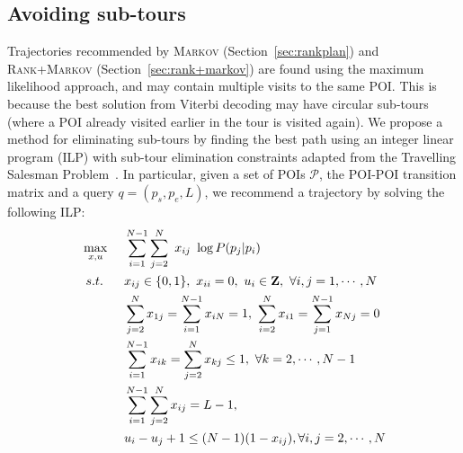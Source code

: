\subsection{Avoiding sub-tours} %
\label{sec:nosubtour}
\secmoveup

Trajectories recommended by \textsc{Markov} (Section~\ref{sec:rankplan}) and \textsc{Rank+Markov} (Section~\ref{sec:rank+markov})
are found using the maximum likelihood approach, and may contain multiple visits to the same POI.
This is because the best solution from Viterbi decoding %
may have
circular sub-tours (where a POI already visited earlier in the tour is visited again).
We propose a method for eliminating sub-tours by %
%
finding the best path using an integer linear program (ILP) with
sub-tour elimination constraints adapted from the Travelling Salesman Problem~\cite{opt98}.
In particular, given a set of POIs $\mathcal{P}$, the POI-POI transition matrix and a query $q = (p_s, p_e, L)$,
we recommend a trajectory by solving the following ILP:
\eqmoveup
\begin{alignat}{5}
\eqmoveup
& \max_{x,u}  ~&& \sum_{i=1}^{N-1} \sum_{j=2}^N ~x_{ij} ~\log P(p_j | p_i)                                                 \nonumber \\
& ~s.t. ~&& x_{ij} \in \{0, 1\}, ~x_{ii} = 0, ~u_i \in \mathbf{Z}, ~\forall i, j = 1, \cdots, N                    \label{eq:cons1} \\
&        && \sum_{j=2}^N x_{1j} = \sum_{i=1}^{N-1} x_{iN} = 1, ~\sum_{i=2}^N x_{i1} = \sum_{j=1}^{N-1} x_{Nj} = 0  \label{eq:cons2} \\
&        && \sum_{i=1}^{N-1} x_{ik} = \sum_{j=2}^N x_{kj} \le 1,   ~\forall k=2, \cdots, N-1                       \label{eq:cons3} \\
&        && \sum_{i=1}^{N-1} \sum_{j=2}^N x_{ij} = L-1,                                                            \label{eq:cons4} \\
&        && u_i - u_j + 1 \le (N-1) (1-x_{ij}),                     \forall i, j = 2, \cdots, N                    \label{eq:cons5}
\end{alignat}
